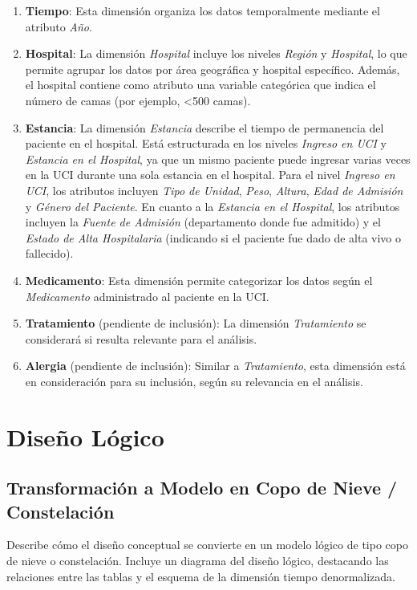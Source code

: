 \documentclass{article}
\begin{document}
\begin{enumerate}
	\item \textbf{Tiempo}: Esta dimensión organiza los datos temporalmente mediante el atributo \textit{Año}.
	
	\item \textbf{Hospital}: La dimensión \textit{Hospital} incluye los niveles \textit{Región} y \textit{Hospital}, lo que permite agrupar los datos por área geográfica y hospital específico. Además, el hospital contiene como atributo una variable categórica que indica el número de camas (por ejemplo, <500 camas).
	
	\item \textbf{Estancia}: La dimensión \textit{Estancia} describe el tiempo de permanencia del paciente en el hospital. Está estructurada en los niveles \textit{Ingreso en UCI} y \textit{Estancia en el Hospital}, ya que un mismo paciente puede ingresar varias veces en la UCI durante una sola estancia en el hospital. Para el nivel \textit{Ingreso en UCI}, los atributos incluyen \textit{Tipo de Unidad}, \textit{Peso}, \textit{Altura}, \textit{Edad de Admisión} y \textit{Género del Paciente}. En cuanto a la \textit{Estancia en el Hospital}, los atributos incluyen la \textit{Fuente de Admisión} (departamento donde fue admitido) y el \textit{Estado de Alta Hospitalaria} (indicando si el paciente fue dado de alta vivo o fallecido).
	
	\item \textbf{Medicamento}: Esta dimensión permite categorizar los datos según el \textit{Medicamento} administrado al paciente en la UCI.
	
	\item \textbf{Tratamiento} (pendiente de inclusión): La dimensión \textit{Tratamiento} se considerará si resulta relevante para el análisis.
	
	\item \textbf{Alergia} (pendiente de inclusión): Similar a \textit{Tratamiento}, esta dimensión está en consideración para su inclusión, según su relevancia en el análisis.
\end{enumerate}


\section{Diseño Lógico}
\label{sec:diseno_logico}
\subsection{Transformación a Modelo en Copo de Nieve / Constelación}
Describe cómo el diseño conceptual se convierte en un modelo lógico de tipo copo de nieve o constelación. Incluye un diagrama del diseño lógico, destacando las relaciones entre las tablas y el esquema de la dimensión tiempo denormalizada.
\end{document}
